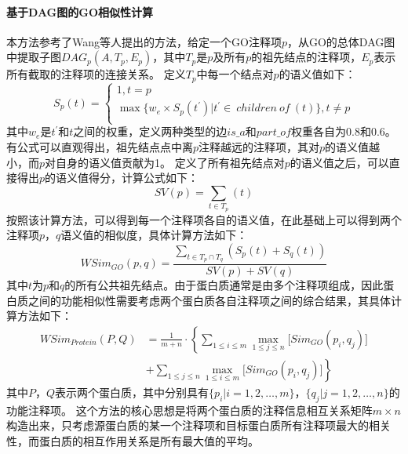 \paragraph*{基于DAG图的GO相似性计算}

本方法参考了Wang等人\cite{wang_new_2007}提出的方法，给定一个GO注释项$p$，从GO的总体DAG图中提取子图$DAG_p(A,T_p,E_p)$，其中$T_p$是$p$及所有$p$的祖先结点的注释项，$E_p$表示所有截取的注释项的连接关系。
定义$T_p$中每一个结点对$p$的语义值如下：
\begin{equation}
    \label{equ:feat:go:SAT}
    S_p(t)=\left\{\begin{array}{l}
        1,t=p                                                                        \\
        \max {\{ w_e\times S_p(t^\prime )| t^\prime\in ~children~of~(t) \} },t\neq p \\
    \end{array}\right.
\end{equation}
其中$w_e$是$t^\prime$和$t$之间的权重，定义两种类型的边$is\_a$和$part\_of$权重各自为0.8和0.6。有公式可以直观得出，祖先结点点中离$p$注释越远的注释项，其对$p$的语义值越小，而$p$对自身的语义值贡献为1。
定义了所有祖先结点对$p$的语义值之后，可以直接得出$p$的语义值得分，计算公式如下：
\begin{equation}
    \label{equ:feat:go:SVA}
    SV(p)=\sum_{t \in T_p}(t)
\end{equation}
按照该计算方法，可以得到每一个注释项各自的语义值，在此基础上可以得到两个注释项$p$，$q$语义值的相似度，具体计算方法如下：
\begin{equation}
    \label{equ:feat:go:SimItemWang}
    WSim_{GO}(p,q)=\frac{\sum_{t \in T_p \cap T_q}(S_p(t)+S_q(t))}{SV(p)+SV(q)}
\end{equation}
其中$t$为$p$和$q$的所有公共祖先结点。由于蛋白质通常是由多个注释项组成，因此蛋白质之间的功能相似性需要考虑两个蛋白质各自注释项之间的综合结果，其具体计算方法如下：
\begin{equation}
    \label{equ:feat:go:SimProteinWang}
    \begin{aligned}
        WSim_{Protein}(P,Q) & =\frac{1}{m+n}\cdot \left\{\sum_{1\leq i\leq m}{\max_{1\leq j\leq n}[{Sim_{GO}(p_i,q_j)}}]\right. \\
                            & \left.+\sum_{1\leq j\leq n}{\max_{1\leq i\leq m}[{Sim_{GO}(p_i,q_j)}}]\right\}
    \end{aligned}
\end{equation}
其中$P$，$Q$表示两个蛋白质，其中分别具有$\{p_i| i=1,2,\dots,m\}$，$\{q_j| j=1,2,\dots,n\}$的功能注释项。
这个方法的核心思想是将两个蛋白质的注释信息相互关系矩阵$m\times n$构造出来，只考虑源蛋白质的某一个注释项和目标蛋白质所有注释项最大的相关性，而蛋白质的相互作用关系是所有最大值的平均。

